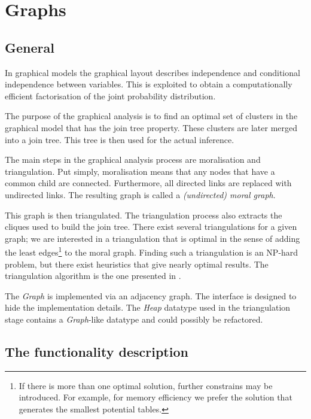 \documentclass[12pt,a4paper]{report}
\newcommand{\cdatatype}[1]{{\it #1}}
\begin{document}
\newpage
\section{Graphs}
\subsection{General}

In graphical models the graphical layout describes independence and
conditional independence between variables. This is exploited to
obtain a computationally efficient factorisation of the joint
probability distribution. 

The purpose of the graphical analysis is to find an optimal set of
clusters in the graphical model that has the join tree property. These
clusters are later merged into a join tree. This tree is then used for
the actual inference.

The main steps in the graphical analysis process are moralisation and
triangulation. Put simply, moralisation means that any nodes that have
a common child are connected. Furthermore, all directed links are
replaced with undirected links. The resulting graph is called a {\it
(undirected) moral graph}. 

This graph is then triangulated. The triangulation process also
extracts the cliques used to build the join tree.  There exist several
triangulations for a given graph; we are interested in a triangulation
that is optimal in the sense of adding the least edges\footnote{If
there is more than one optimal solution, further constrains may be
introduced. For example, for memory efficiency we prefer the solution
that generates the smallest potential tables.} to the moral
graph. Finding such a triangulation is an NP-hard problem, but there
exist heuristics that give nearly optimal results.  The triangulation
algorithm is the one presented in \cite{huang1994}.

The \cdatatype{Graph} is implemented via an adjacency graph. The
interface is designed to hide the implementation details. The
\cdatatype{Heap} datatype used in the triangulation stage contains a
\cdatatype{Graph}-like datatype and could possibly be refactored.


\subsection{The functionality description}
\end{document}

